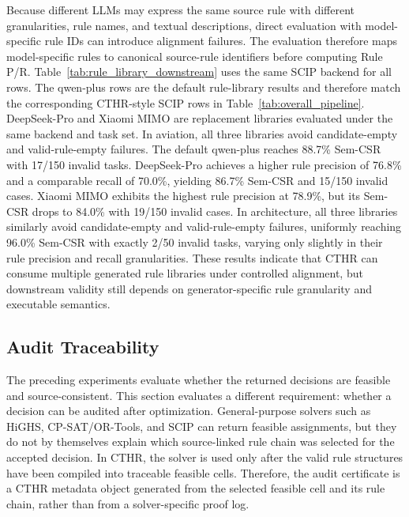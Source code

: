﻿\documentclass[a4paper,fleqn]{cas-dc}
\newcommand{\CTHR}{\textsc{CTHR}}
\begin{document}
Because different LLMs may express the same source rule with different
granularities, rule names, and textual descriptions, direct evaluation with
model-specific rule IDs can introduce alignment failures. The evaluation therefore maps
model-specific rules to canonical source-rule identifiers before computing Rule
P/R. Table~\ref{tab:rule_library_downstream} uses the same SCIP backend for all
rows. The qwen-plus rows are the default rule-library results and therefore
match the corresponding \CTHR{}-style SCIP rows in
Table~\ref{tab:overall_pipeline}. DeepSeek-Pro and Xiaomi MIMO are replacement
libraries evaluated under the same backend and task set. In aviation, all three
libraries avoid candidate-empty and valid-rule-empty failures. The default qwen-plus 
reaches 88.7\% Sem-CSR with 17/150 invalid tasks. DeepSeek-Pro achieves a higher 
rule precision of 76.8\% and a comparable recall of 70.0\%, yielding 86.7\% Sem-CSR 
and 15/150 invalid cases. Xiaomi MIMO exhibits the highest rule precision at 78.9\%, 
but its Sem-CSR drops to 84.0\% with 19/150 invalid cases. In architecture, all 
three libraries similarly avoid candidate-empty and valid-rule-empty failures, 
uniformly reaching 96.0\% Sem-CSR with exactly 2/50 invalid tasks, varying only 
slightly in their rule precision and recall granularities. These results indicate 
that \CTHR{} can consume multiple generated rule libraries under controlled alignment, 
but downstream validity still depends on generator-specific rule granularity 
and executable semantics.
\FloatBarrier


\subsection{Audit Traceability}
\label{sec:audit_traceability_exp}

The preceding experiments evaluate whether the returned decisions are feasible
and source-consistent. This section evaluates a different requirement: whether a
decision can be audited after optimization. General-purpose solvers such as
HiGHS, CP-SAT/OR-Tools, and SCIP can return feasible assignments, but they
do not by themselves explain which source-linked rule chain was selected for
the accepted decision. In \CTHR{}, the solver is used only after the valid rule
structures have been compiled into traceable feasible cells. Therefore, the
audit certificate is a \CTHR{} metadata object generated from the selected
feasible cell and its rule chain, rather than from a solver-specific proof log.
\end{document}
